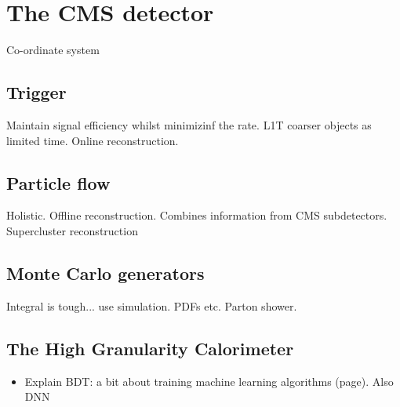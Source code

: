 \chapter{The CMS detector}
\label{chap:cms}

Co-ordinate system

\section{Trigger}\label{sec:trigger}
Maintain signal efficiency whilst minimizinf the rate. L1T coarser objects as limited time. Online reconstruction.

\section{Particle flow}\label{sec:particle_flow}
Holistic.
Offline reconstruction. Combines information from CMS subdetectors. Supercluster reconstruction

\section{Monte Carlo generators}\label{sec:mc}
Integral is tough... use simulation. PDFs etc. Parton shower.

\section{The High Granularity Calorimeter}
\begin{itemize}
    \item Explain BDT: a bit about training machine learning algorithms (page). Also DNN
\end{itemize}
